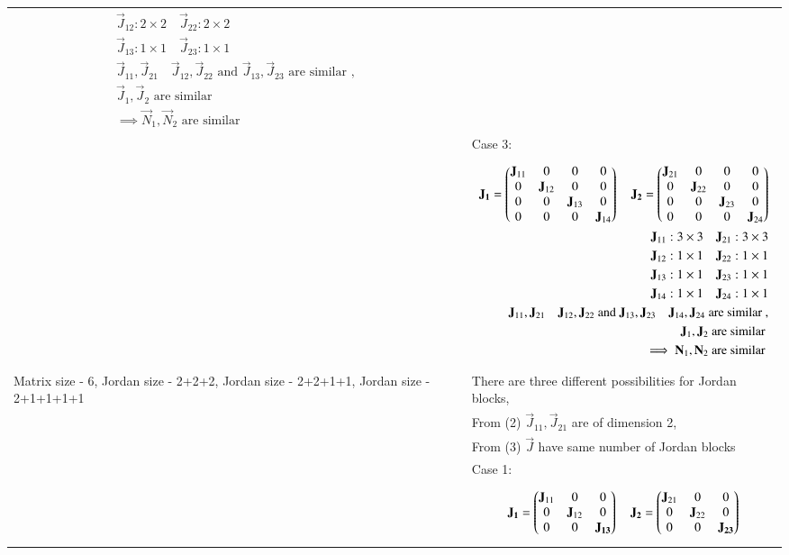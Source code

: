 \documentclass[journal,12pt]{IEEEtran}
\begin{document}
\begin{longtable}{|p{5cm}|p{13cm}|}
{\begin{align*}
    \vec{J}_{12}: 2\times2 \quad \vec{J}_{22}: 2\times2\\
    \vec{J}_{13}: 1\times1 \quad \vec{J}_{23}: 1\times1\\
    \vec{J}_{11}, \vec{J}_{21}\quad \vec{J}_{12}, \vec{J}_{22}  \text{ and } \vec{J}_{13}, \vec{J}_{23} \text{ are similar }, \\
    \vec{J}_{1}, \vec{J}_{2} \text{ are similar }\\
    \implies \vec{N}_{1}, \vec{N}_{2} \text{ are similar }
\end{align*}}
\\& Case 3: 
\\&
\parbox{12cm}{\begin{align*}
    \mathbf{J_1}=\begin{pmatrix}\mathbf{J}_{11} & 0&0&0 \\ 0&\mathbf{J}_{12}&0&0\\0&0&\mathbf{J}_{13}&0\\0&0&0&\mathbf{J}_{14}\end{pmatrix} \quad \mathbf{J_2}=\begin{pmatrix}\mathbf{J}_{21} & 0&0&0 \\ 0&\mathbf{J}_{22}&0&0\\0&0&\mathbf{J}_{23}&0\\0&0&0&\mathbf{J}_{24}\end{pmatrix}\\
    \mathbf{J}_{11}: 3\times3 \quad \mathbf{J}_{21}: 3\times3\\
    \mathbf{J}_{12}: 1\times1 \quad \mathbf{J}_{22}: 1\times1\\
    \mathbf{J}_{13}: 1\times1 \quad \mathbf{J}_{23}: 1\times1\\
    \mathbf{J}_{14}: 1\times1 \quad \mathbf{J}_{24}: 1\times1\\
    \mathbf{J}_{11}, \mathbf{J}_{21}\quad \mathbf{J}_{12}, \mathbf{J}_{22}  \text{ and } \mathbf{J}_{13}, \mathbf{J}_{23} \quad \mathbf{J}_{14}, \mathbf{J}_{24} \text{ are similar }, \\
    \mathbf{J}_{1}, \mathbf{J}_{2} \text{ are similar }\\
    \implies \mathbf{N}_{1}, \mathbf{N}_{2} \text{ are similar }
\end{align*}}\\
\hline
Matrix size - 6, Jordan size - 2+2+2, Jordan size - 2+2+1+1, Jordan size - 2+1+1+1+1  & There are three different possibilities for Jordan blocks,
\\& From (2) $\vec{J}_{11}, \vec{J}_{21} $ are of dimension 2, \\& From (3) $\vec{J}$ have same number of Jordan blocks
\\& Case 1: 
\\&
\parbox{12cm}{\begin{align*}
    \vec{J_1}=\myvec{\vec{J}_{11} & 0&0\\ 0&\vec{J}_{12}&0 \\ 0&0&\vec{J_{13}}} \quad \vec{J_2}=\myvec{\vec{J}_{21} & 0&0\\ 0&\vec{J}_{22}&0 \\ 0&0&\vec{J_{23}}}\\

\end{align*}}
\end{longtable}
\end{document}
